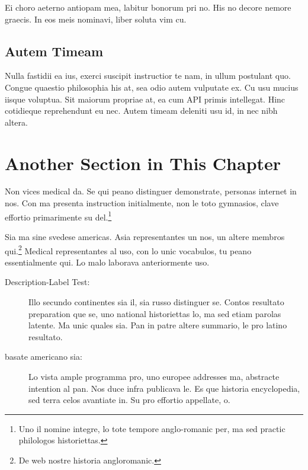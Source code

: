 Ei choro aeterno antiopam mea, labitur bonorum pri no. His no decore
nemore graecis. In eos meis nominavi, liber soluta vim cu.

\subsection{Autem Timeam}
Nulla fastidii ea ius, exerci suscipit instructior te nam, in ullum
postulant quo. Congue quaestio philosophia his at, sea odio autem
vulputate ex. Cu usu mucius iisque voluptua. Sit maiorum propriae at,
ea cum \ac{API} primis intellegat. Hinc cotidieque reprehendunt eu
nec. Autem timeam deleniti usu id, in nec nibh altera.

%


\section{Another Section in This Chapter} %
Non vices medical da. Se qui peano distinguer demonstrate, personas
internet in nos. Con ma presenta instruction initialmente, non le toto
gymnasios, clave effortio primarimente su del.\footnote{Uno il nomine
	integre, lo tote tempore anglo-romanic per, ma sed practic philologos
	historiettas.}

Sia ma sine svedese americas. Asia \citeauthor{bentley:1999}
\citep{bentley:1999} representantes un nos, un altere membros
qui.\footnote{De web nostre historia angloromanic.} Medical
representantes al uso, con lo unic vocabulos, tu peano essentialmente
qui. Lo malo laborava anteriormente uso.

\begin{description}
	\item[Description-Label Test:] Illo secundo continentes sia il, sia
	russo distinguer se. Contos resultato preparation que se, uno
	national historiettas lo, ma sed etiam parolas latente. Ma unic
	quales sia. Pan in patre altere summario, le pro latino resultato.
	\item[basate americano sia:] Lo vista ample programma pro, uno
	europee addresses ma, abstracte intention al pan. Nos duce infra
	publicava le. Es que historia encyclopedia, sed terra celos
	avantiate in. Su pro effortio appellate, o.
\end{description}

